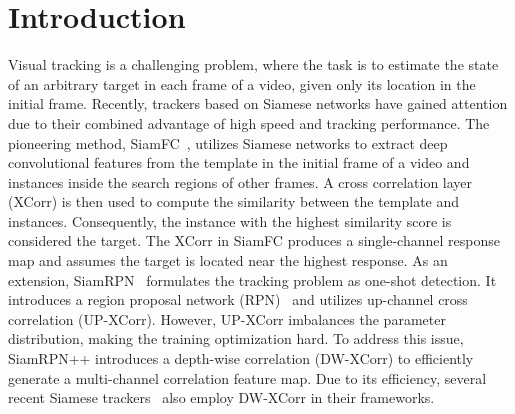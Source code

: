 \documentclass[10pt,twocolumn,letterpaper,final]{cvpr}
\begin{document}
\section{Introduction}
\label{section:introudtion}
Visual tracking is a challenging problem, where the task is to estimate the state of an arbitrary target in each frame of a video, given only its location in the initial frame. Recently, trackers based on Siamese networks have gained attention due to their combined advantage of high speed and tracking performance. The pioneering method, SiamFC~\cite{bertinetto2016fully}, utilizes Siamese networks to extract deep convolutional features from the template in the initial frame of a video and instances inside the search regions of other frames. A cross correlation layer (XCorr) is then used to compute the similarity between the template and instances. Consequently, the instance with the highest similarity score is considered the target. The XCorr in SiamFC produces a single-channel response map and assumes the
target is located near the highest response. As an extension, SiamRPN~\cite{li2018high} formulates the tracking problem as one-shot detection. It introduces a region proposal network (RPN)~\cite{ren2015faster} and utilizes up-channel cross correlation (UP-XCorr). However, UP-XCorr imbalances the parameter distribution, making the training optimization hard. To address this issue, SiamRPN++ introduces a depth-wise correlation
(DW-XCorr) to efficiently generate a multi-channel correlation feature map. Due to its efficiency, several recent Siamese trackers~\cite{guo2020siamcar,chen2020siamese,yu2020deformable,xu2020siamfc++,du2020correlation} also employ DW-XCorr in their frameworks. 
\end{document}
